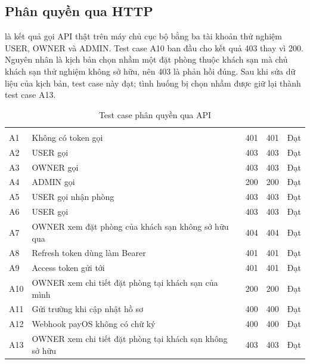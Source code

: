 \subsection{Phân quyền qua HTTP}

 là kết quả gọi API thật trên máy chủ cục bộ bằng ba tài khoản thử nghiệm USER, OWNER và ADMIN. Test case A10 ban đầu cho kết quả 403 thay vì 200. Nguyên nhân là kịch bản chọn nhầm một đặt phòng thuộc khách sạn mà chủ khách sạn thử nghiệm không sở hữu, nên 403 là phản hồi đúng. Sau khi sửa dữ liệu của kịch bản, test case này đạt; tình huống bị chọn nhầm được giữ lại thành test case A13.

\begin{rtable}
\begin{longtable}{|C{1.0cm}|L{7.6cm}|C{1.6cm}|C{1.6cm}|C{1.8cm}|}
\caption{Test case phân quyền qua API}\label{tab:test-authz}\\
\hline
{} &  &  &  &  \\ \hline
\endfirsthead
\hline
{} &  &  &  &  \\ \hline
\endhead
A1 & Không có token gọi  & 401 & 401 & Đạt \\ \hline
A2 & USER gọi  & 403 & 403 & Đạt \\ \hline
A3 & OWNER gọi  & 403 & 403 & Đạt \\ \hline
A4 & ADMIN gọi  & 200 & 200 & Đạt \\ \hline
A5 & USER gọi nhận phòng & 403 & 403 & Đạt \\ \hline
A6 & USER gọi  & 403 & 403 & Đạt \\ \hline
A7 & OWNER xem đặt phòng của khách sạn không sở hữu qua  & 404 & 404 & Đạt \\ \hline
A8 & Refresh token dùng làm Bearer & 401 & 401 & Đạt \\ \hline
A9 & Access token gửi tới  & 401 & 401 & Đạt \\ \hline
A10 & OWNER xem chi tiết đặt phòng tại khách sạn của mình & 200 & 200 & Đạt \\ \hline
A11 & Gửi trường  khi cập nhật hồ sơ & 400 & 400 & Đạt \\ \hline
A12 & Webhook payOS không có chữ ký & 400 & 400 & Đạt \\ \hline
A13 & OWNER xem chi tiết đặt phòng tại khách sạn không sở hữu & 403 & 403 & Đạt \\ \hline
\end{longtable}
\end{rtable}


